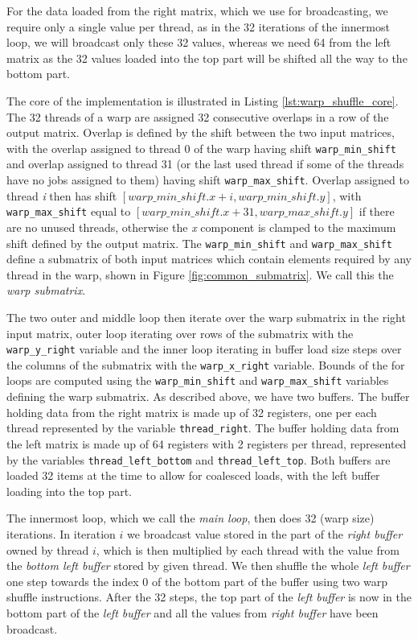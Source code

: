 For the data loaded from the right matrix, which we use for broadcasting, we require only a single value per thread, as in the 32 iterations of the innermost loop, we will broadcast only these 32 values, whereas we need 64 from the left matrix as the 32 values loaded into the top part will be shifted all the way to the bottom part.

The core of the implementation is illustrated in Listing \ref{lst:warp_shuffle_core}. The 32 threads of a warp are assigned 32 consecutive overlaps in a row of the output matrix. Overlap is defined by the shift between the two input matrices, with the overlap assigned to thread 0 of the warp having shift \texttt{warp\_min\_shift} and overlap assigned to thread 31 (or the last used thread if some of the threads have no jobs assigned to them) having shift \texttt{warp\_max\_shift}. Overlap assigned to thread \textit{i} then has shift $[warp\_min\_shift.x + i, warp\_min\_shift.y]$,  with \texttt{warp\_max\_shift} equal to $[warp\_min\_shift.x + 31, warp\_max\_shift.y]$ if there are no unused threads, otherwise the \textit{x} component is clamped to the maximum shift defined by the output matrix. The \texttt{warp\_min\_shift} and \texttt{warp\_max\_shift} define a submatrix of both input matrices which contain elements required by any thread in the warp, shown in Figure \ref{fig:common_submatrix}. We call this the \textit{warp submatrix}.

The two outer and middle loop then iterate over the warp submatrix in the right input matrix, outer loop iterating over rows of the submatrix with the \texttt{warp\_y\_right} variable and the inner loop iterating in buffer load size steps over the columns of the submatrix with the \texttt{warp\_x\_right} variable. Bounds of the for loops are computed using the \texttt{warp\_min\_shift} and \texttt{warp\_max\_shift} variables defining the warp submatrix. As described above, we have two buffers. The buffer holding data from the right matrix is made up of 32 registers, one per each thread represented by the variable \texttt{thread\_right}. The buffer holding data from the left matrix is made up of 64 registers with 2 registers per thread, represented by the variables \texttt{thread\_left\_bottom} and \texttt{thread\_left\_top}. Both buffers are loaded 32 items at the time to allow for coalesced loads, with the left buffer loading into the top part. 

The innermost loop, which we call the \textit{main loop}, then does 32 (warp size) iterations. In iteration $i$ we broadcast value stored in the part of the \textit{right buffer} owned by thread $i$, which is then multiplied by each thread with the value from the \textit{bottom left buffer} stored by given thread. We then shuffle the whole \textit{left buffer} one step towards the index 0 of the bottom part of the buffer using two warp shuffle instructions. After the 32 steps, the top part of the \textit{left buffer} is now in the bottom part of the \textit{left buffer} and all the values from \textit{right buffer} have been broadcast. 

